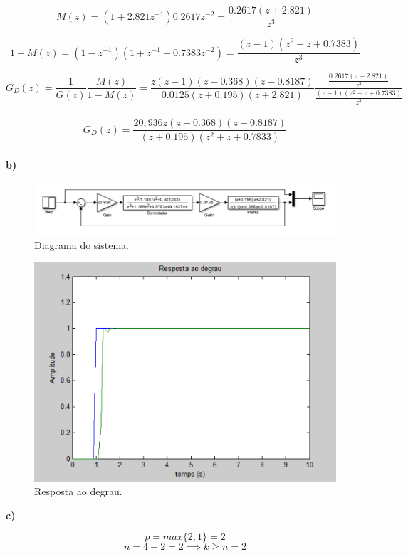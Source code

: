 \documentclass{article}
\begin{document}
    $$ M(z) = (1 + 2.821z^{-1})0.2617z^{-2} = \frac{ 0.2617(z+2.821) }{ z^3 } $$

    $$ 1-M(z) = (1-z^{-1})(1 + z^{-1} + 0.7383z^{-2}) = \frac{ (z-1)(z^2 + z + 0.7383) }{ z^3 } $$

    $$ G_{D}(z) = \frac{1}{G(z)} \frac{M(z)}{1-M(z)} = \frac{ z(z-1)(z-0.368)(z-0.8187) }{ 0.0125(z+0.195)(z+2.821) } \frac{ \frac{0.2617(z+2.821)} {z^3} }{ \frac{ (z-1)(z^2 + z + 0.7383) }{ z^3 } } $$\\[0.1cm]

    $$ G_{D}(z) = \frac{ 20,936z(z-0.368)(z-0.8187) }{ (z+0.195)(z^2 + z + 0.7833) } $$\\[0.5cm]

    {\textbf{b)}}

    \begin{figure}[H]
       \centering
            \includegraphics[width=1\linewidth]{images/diagrama1b.png}
            \caption{Diagrama do sistema.}
            \label{fig:diagram1b}
    \end{figure}

    \begin{figure}[H]
       \centering
            \includegraphics[width=.7\linewidth]{images/grafico1b.png}
            \caption{Resposta ao degrau.}
            \label{fig:graph1b}
    \end{figure}

    \clearpage

    {\textbf{c)}}

    $$ p = max\{ 2,1 \} = 2 $$
    $$ n = 4-2 = 2 \implies k \geq n = 2 $$\\[0.1cm]
\end{document}
